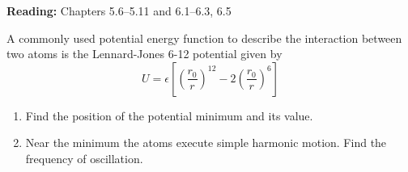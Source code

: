\documentclass[12pt,letterpaper]{hmcpset}
\begin{document}

\noindent
\textbf{Reading:} Chapters 5.6--5.11 and 6.1--6.3, 6.5

\begin{problem}
  A commonly used potential energy function to describe the interaction between
  two atoms is the Lennard-Jones 6-12 potential given by
  \begin{equation*}
	U = \epsilon \left[
      \left( \frac{r_{0}}{r} \right)^{12} - 2 \left( \frac{r_{0}}{r} \right)^{6}
    \right]
  \end{equation*}
  \begin{enumerate}
    \item Find the position of the potential minimum and its value.
    \item Near the minimum the atoms execute simple harmonic motion. Find the
      frequency of oscillation.
  \end{enumerate}
\end{problem}

\begin{solution}
    \vfill
\end{solution}
\clearpage
\end{document}
